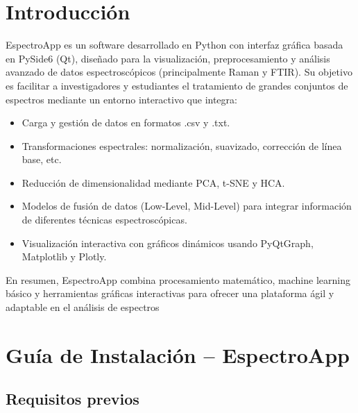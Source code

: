 \documentclass[12pt]{article}
\begin{document}
\section{Introducción}
EspectroApp es un software desarrollado en Python con interfaz gráfica basada en PySide6 (Qt), diseñado para la visualización, preprocesamiento y análisis avanzado de datos espectroscópicos (principalmente Raman y FTIR).
Su objetivo es facilitar a investigadores y estudiantes el tratamiento de grandes conjuntos de espectros mediante un entorno interactivo que integra:
\begin{itemize}
    \item Carga y gestión de datos en formatos .csv y .txt.
    \item Transformaciones espectrales: normalización, suavizado, corrección de línea base, etc.
    \item Reducción de dimensionalidad mediante PCA, t-SNE y HCA.
    \item Modelos de fusión de datos (Low-Level, Mid-Level) para integrar información de diferentes técnicas espectroscópicas.
    \item Visualización interactiva con gráficos dinámicos usando PyQtGraph, Matplotlib y Plotly.
\end{itemize}
En resumen, EspectroApp combina procesamiento matemático, machine learning básico y herramientas gráficas interactivas para ofrecer una plataforma ágil y adaptable en el análisis de espectros


\newpage
    \section{Guía de Instalación – EspectroApp}
    
    \subsection*{Requisitos previos}
    
\end{document}
